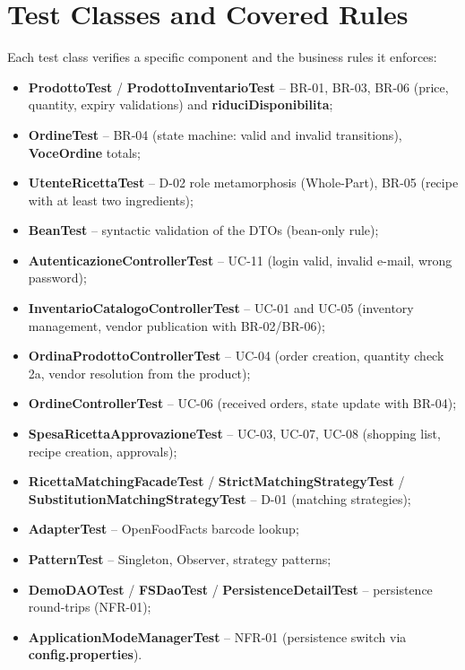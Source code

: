 \section{Test Classes and Covered Rules}

Each test class verifies a specific component and the business rules it
enforces:

\begin{itemize}
    \item \textbf{ProdottoTest} / \textbf{ProdottoInventarioTest} --
    BR-01, BR-03, BR-06 (price, quantity, expiry validations) and
    \textbf{riduciDisponibilita};
    \item \textbf{OrdineTest} -- BR-04 (state machine: valid and invalid
    transitions), \textbf{VoceOrdine} totals;
    \item \textbf{UtenteRicettaTest} -- D-02 role metamorphosis
    (Whole-Part), BR-05 (recipe with at least two ingredients);
    \item \textbf{BeanTest} -- syntactic validation of the DTOs
    (bean-only rule);
    \item \textbf{AutenticazioneControllerTest} -- UC-11 (login valid,
    invalid e-mail, wrong password);
    \item \textbf{InventarioCatalogoControllerTest} -- UC-01 and UC-05
    (inventory management, vendor publication with BR-02/BR-06);
    \item \textbf{OrdinaProdottoControllerTest} -- UC-04 (order creation,
    quantity check 2a, vendor resolution from the product);
    \item \textbf{OrdineControllerTest} -- UC-06 (received orders,
    state update with BR-04);
    \item \textbf{SpesaRicettaApprovazioneTest} -- UC-03, UC-07, UC-08
    (shopping list, recipe creation, approvals);
    \item \textbf{RicettaMatchingFacadeTest} / \textbf{StrictMatchingStrategyTest}
    / \textbf{SubstitutionMatchingStrategyTest} -- D-01 (matching
    strategies);
    \item \textbf{AdapterTest} -- OpenFoodFacts barcode lookup;
    \item \textbf{PatternTest} -- Singleton, Observer, strategy patterns;
    \item \textbf{DemoDAOTest} / \textbf{FSDaoTest} /
    \textbf{PersistenceDetailTest} -- persistence round-trips (NFR-01);
    \item \textbf{ApplicationModeManagerTest} -- NFR-01 (persistence
    switch via \textbf{config.properties}).
\end{itemize}

